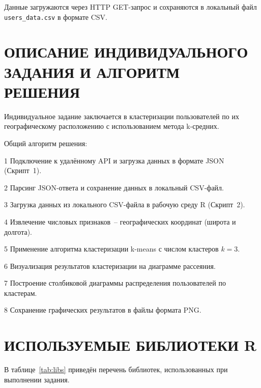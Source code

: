 \documentclass[14pt,a4paper]{extarticle}
\begin{document}
Данные загружаются через HTTP GET-запрос и сохраняются в локальный файл \texttt{users\_data.csv} в формате CSV.

\newpage

\section{ОПИСАНИЕ ИНДИВИДУАЛЬНОГО ЗАДАНИЯ И АЛГОРИТМ РЕШЕНИЯ}

Индивидуальное задание заключается в кластеризации пользователей по их географическому расположению с использованием метода k-средних.

Общий алгоритм решения:

1 Подключение к удалённому API и загрузка данных в формате JSON (Скрипт~1).

2 Парсинг JSON-ответа и сохранение данных в локальный CSV-файл.

3 Загрузка данных из локального CSV-файла в рабочую среду R (Скрипт~2).

4 Извлечение числовых признаков~-- географических координат (широта и долгота).

5 Применение алгоритма кластеризации k-means с числом кластеров $k = 3$.

6 Визуализация результатов кластеризации на диаграмме рассеяния.

7 Построение столбиковой диаграммы распределения пользователей по кластерам.

8 Сохранение графических результатов в файлы формата PNG.

\newpage

\section{ИСПОЛЬЗУЕМЫЕ БИБЛИОТЕКИ R}

В таблице~\ref{tab:libs} приведён перечень библиотек, использованных при выполнении задания.
\end{document}
